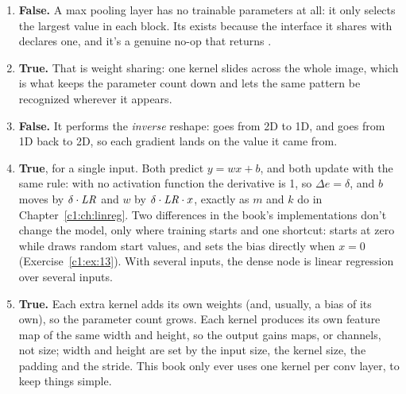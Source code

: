 \begin{enumerate}
  \item \textbf{False.} A max pooling layer has no trainable parameters at all: it only selects the
    largest value in each block. Its  exists because the interface it shares with
     declares one, and it's a genuine no-op that returns .
  \item \textbf{True.} That is weight sharing: one kernel slides across the whole image, which is
    what keeps the parameter count down and lets the same pattern be recognized wherever it
    appears.
  \item \textbf{False.} It performs the \emph{inverse} reshape:  goes from 2D
    to 1D, and  goes from 1D back to 2D, so each gradient lands on the value
    it came from.
  \item \textbf{True}, for a single input. Both predict $y = wx + b$, and both update with the
    same rule: with no activation function the derivative is 1, so $\Delta e = \delta$, and
    $b$ moves by $\delta \cdot \mathit{LR}$ and $w$ by $\delta \cdot \mathit{LR} \cdot x$, exactly as $m$ and $k$
    do in Chapter~\ref{c1:ch:linreg}. Two differences in the book's implementations don't change
    the model, only where training starts and one shortcut:  starts at
    zero while  draws random start values, and  sets the bias
    directly when $x = 0$ (Exercise~\ref{c1:ex:13}). With several inputs, the dense node is linear
    regression over several inputs.
  \item \textbf{True.} Each extra kernel adds its own weights (and, usually, a bias of its own), so
    the parameter count grows. Each kernel produces its own feature map of the same width and
    height, so the output gains maps, or channels, not size; width and height are set by the input
    size, the kernel size, the padding and the stride. This book only ever uses one kernel per conv
    layer, to keep things simple.
\end{enumerate}

